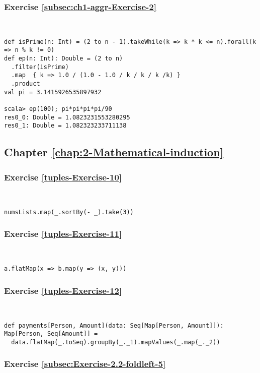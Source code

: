 \subsubsection*{Exercise \ref{subsec:ch1-aggr-Exercise-2}}

~
\begin{lstlisting}
def isPrime(n: Int) = (2 to n - 1).takeWhile(k => k * k <= n).forall(k => n % k != 0)
def ep(n: Int): Double = (2 to n)
  .filter(isPrime)
  .map  { k => 1.0 / (1.0 - 1.0 / k / k / k /k) }
  .product
val pi = 3.1415926535897932

scala> ep(100); pi*pi*pi*pi/90
res0_0: Double = 1.0823231553280295
res0_1: Double = 1.082323233711138 
\end{lstlisting}


\subsection*{Chapter \ref{chap:2-Mathematical-induction}}

\subsubsection*{Exercise \ref{tuples-Exercise-10}}

~
\begin{lstlisting}
numsLists.map(_.sortBy(- _).take(3))
\end{lstlisting}


\subsubsection*{Exercise \ref{tuples-Exercise-11}}

~
\begin{lstlisting}
a.flatMap(x => b.map(y => (x, y)))
\end{lstlisting}


\subsubsection*{Exercise \ref{tuples-Exercise-12}}

~
\begin{lstlisting}
def payments[Person, Amount](data: Seq[Map[Person, Amount]]): Map[Person, Seq[Amount]] =
  data.flatMap(_.toSeq).groupBy(_._1).mapValues(_.map(_._2))
\end{lstlisting}


\subsubsection*{Exercise \ref{subsec:Exercise-2.2-foldleft-5}}

